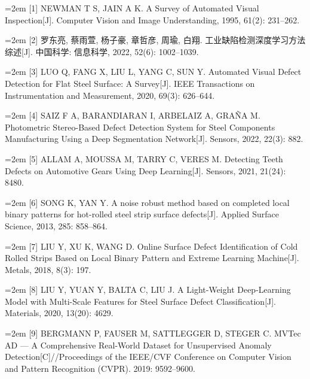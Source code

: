 {\small\noindent\hangindent=2em \hypertarget{ref:1}{}[1] NEWMAN T S, JAIN A K. A Survey of Automated Visual Inspection[J]. Computer Vision and Image Understanding, 1995, 61(2): 231–262.\par}

{\small\noindent\hangindent=2em \hypertarget{ref:2}{}[2] 罗东亮, 蔡雨萱, 杨子豪, 章哲彦, 周瑜, 白翔. 工业缺陷检测深度学习方法综述[J]. 中国科学: 信息科学, 2022, 52(6): 1002–1039.\par}

{\small\noindent\hangindent=2em \hypertarget{ref:3}{}[3] LUO Q, FANG X, LIU L, YANG C, SUN Y. Automated Visual Defect Detection for Flat Steel Surface: A Survey[J]. IEEE Transactions on Instrumentation and Measurement, 2020, 69(3): 626–644.\par}

{\small\noindent\hangindent=2em \hypertarget{ref:4}{}[4] SAIZ F A, BARANDIARAN I, ARBELAIZ A, GRAÑA M. Photometric Stereo-Based Defect Detection System for Steel Components Manufacturing Using a Deep Segmentation Network[J]. Sensors, 2022, 22(3): 882.\par}

{\small\noindent\hangindent=2em \hypertarget{ref:5}{}[5] ALLAM A, MOUSSA M, TARRY C, VERES M. Detecting Teeth Defects on Automotive Gears Using Deep Learning[J]. Sensors, 2021, 21(24): 8480.\par}

{\small\noindent\hangindent=2em \hypertarget{ref:6}{}[6] SONG K, YAN Y. A noise robust method based on completed local binary patterns for hot-rolled steel strip surface defects[J]. Applied Surface Science, 2013, 285: 858–864.\par}

{\small\noindent\hangindent=2em \hypertarget{ref:7}{}[7] LIU Y, XU K, WANG D. Online Surface Defect Identification of Cold Rolled Strips Based on Local Binary Pattern and Extreme Learning Machine[J]. Metals, 2018, 8(3): 197.\par}

{\small\noindent\hangindent=2em \hypertarget{ref:8}{}[8] LIU Y, YUAN Y, BALTA C, LIU J. A Light-Weight Deep-Learning Model with Multi-Scale Features for Steel Surface Defect Classification[J]. Materials, 2020, 13(20): 4629.\par}

{\small\noindent\hangindent=2em \hypertarget{ref:9}{}[9] BERGMANN P, FAUSER M, SATTLEGGER D, STEGER C. MVTec AD — A Comprehensive Real-World Dataset for Unsupervised Anomaly Detection[C]//Proceedings of the IEEE/CVF Conference on Computer Vision and Pattern Recognition (CVPR). 2019: 9592–9600.\par}

